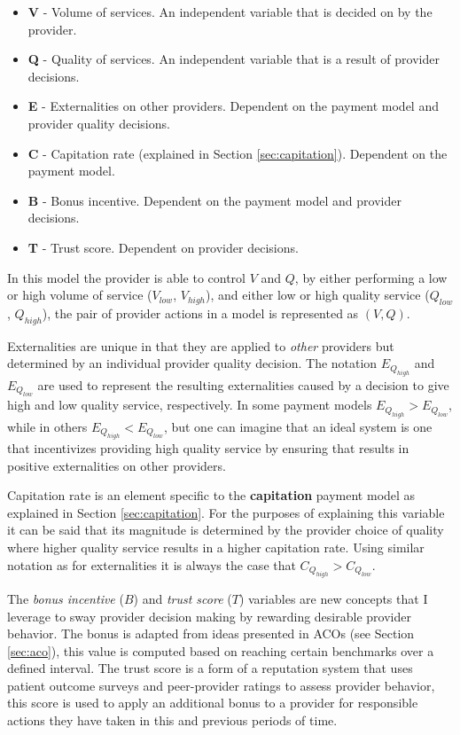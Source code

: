 \documentclass{article}
\begin{document}
\begin{itemize}
    \item \textbf{V} - Volume of services. An independent variable that is decided on by the provider.
    \item \textbf{Q} - Quality of services. An independent variable that is a result of provider decisions.
    \item \textbf{E} - Externalities on other providers. Dependent on the payment model and provider quality decisions.
    \item \textbf{C} - Capitation rate (explained in Section \ref{sec:capitation}). Dependent on the payment model.
    \item \textbf{B} - Bonus incentive. Dependent on the payment model and provider decisions.
    \item \textbf{T} - Trust score. Dependent on provider decisions.
\end{itemize}

In this model the provider is able to control $V$ and $Q$, by either performing a low or high volume of service ($V_{low}$, $V_{high}$), and either low or high quality service ($Q_{low}$, $Q_{high}$), the pair of provider actions in a model is represented as $(V, Q)$.

Externalities are unique in that they are applied to \emph{other} providers but determined by an individual provider quality decision. The notation $E_{Q_{high}}$ and $E_{Q_{low}}$ are used to represent the resulting externalities caused by a decision to give high and low quality service, respectively. In some payment models $E_{Q_{high}} > E_{Q_{low}}$, while in others $E_{Q_{high}} < E_{Q_{low}}$, but one can imagine that an ideal system is one that incentivizes providing high quality service by ensuring that results in positive externalities on other providers.

Capitation rate is an element specific to the \textbf{capitation} payment model as explained in Section \ref{sec:capitation}. For the purposes of explaining this variable it can be said that its magnitude is determined by the provider choice of quality where higher quality service results in a higher capitation rate. Using similar notation as for externalities it is always the case that $C_{Q_{high}} > C_{Q_{low}}$.

The \emph{bonus incentive} ($B$) and \emph{trust score} ($T$) variables are new concepts that I leverage to sway provider decision making by rewarding desirable provider behavior. The bonus is adapted from ideas presented in ACOs (see Section \ref{sec:aco}), this value is computed based on reaching certain benchmarks over a defined interval. The trust score is a form of a reputation system \cite{tim} that uses patient outcome surveys and peer-provider ratings to assess provider behavior, this score is used to apply an additional bonus to a provider for responsible actions they have taken in this and previous periods of time.
\end{document}

